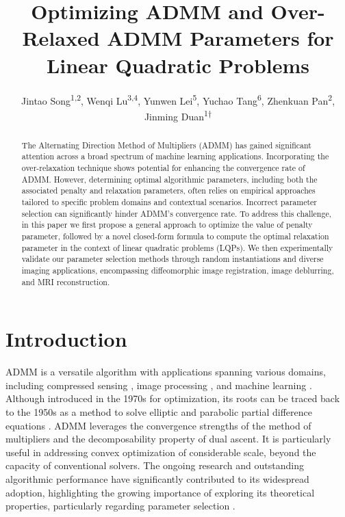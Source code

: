 \documentclass[letterpaper]{article} %
\title{Optimizing ADMM and Over-Relaxed ADMM  Parameters for \\Linear Quadratic Problems}
\author{
   Jintao Song\textsuperscript{\rm 1,\rm2}, Wenqi Lu\textsuperscript{\rm3,\rm4}, Yunwen Lei\textsuperscript{\rm 5}, Yuchao Tang\textsuperscript{\rm 6}, Zhenkuan Pan\textsuperscript{\rm 2}, Jinming Duan\textsuperscript{\rm 1{$\dagger$}}\\
  }
\begin{document}
\maketitle

\begin{abstract}
The Alternating Direction Method of Multipliers (ADMM) has gained significant attention across a broad spectrum of machine learning applications. Incorporating the over-relaxation technique shows potential for enhancing the convergence rate of ADMM. However, determining optimal algorithmic parameters, including both the associated penalty and relaxation parameters, often relies on empirical approaches tailored to specific problem domains and contextual scenarios. Incorrect parameter selection can significantly hinder ADMM's convergence rate. To address this challenge, in this paper we first propose a general approach to optimize the value of penalty parameter, followed by a novel closed-form formula to compute the optimal relaxation parameter in the context of linear quadratic problems (LQPs). We then experimentally validate our parameter selection methods through random instantiations and diverse imaging applications, encompassing diffeomorphic image registration, image deblurring, and MRI reconstruction.
\end{abstract}

\section{Introduction}

ADMM is a versatile algorithm with applications spanning various domains, including compressed sensing \cite{hou2022truncated,liu2023distributed}, image processing \cite{chan2016plug,yazaki2019interpolation}, and machine learning \cite{li2022robust,zhou2023federated}. Although introduced in the 1970s for optimization, its roots can be traced back to the 1950s as a method to solve elliptic and parabolic partial difference equations \cite{boyd2011distributed}. ADMM leverages the convergence strengths of the method of multipliers and the decomposability property of dual ascent. It is particularly useful in addressing convex optimization of considerable scale, beyond the capacity of conventional solvers. The ongoing research and outstanding algorithmic performance have significantly contributed to its widespread adoption, highlighting the growing importance of exploring its theoretical properties, particularly regarding parameter selection \cite{ghadimi2014optimal,wang2019admm}.
\end{document}
